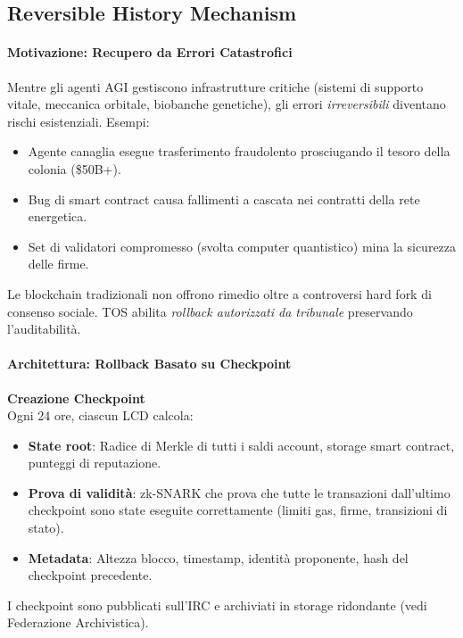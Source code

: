 \documentclass[11pt]{article}
\begin{document}
\subsection{Reversible History Mechanism}

\paragraph{Motivazione: Recupero da Errori Catastrofici}
Mentre gli agenti AGI gestiscono infrastrutture critiche (sistemi di supporto vitale, meccanica orbitale, biobanche genetiche), gli errori \emph{irreversibili} diventano rischi esistenziali. Esempi:
\begin{itemize}[noitemsep]
  \item Agente canaglia esegue trasferimento fraudolento prosciugando il tesoro della colonia (\$50B+).
  \item Bug di smart contract causa fallimenti a cascata nei contratti della rete energetica.
  \item Set di validatori compromesso (svolta computer quantistico) mina la sicurezza delle firme.
\end{itemize}
Le blockchain tradizionali non offrono rimedio oltre a controversi hard fork di consenso sociale. TOS abilita \emph{rollback autorizzati da tribunale} preservando l'auditabilità.

\paragraph{Architettura: Rollback Basato su Checkpoint}
\textbf{Creazione Checkpoint}\\
Ogni 24 ore, ciascun LCD calcola:
\begin{itemize}[noitemsep]
  \item \textbf{State root}: Radice di Merkle di tutti i saldi account, storage smart contract, punteggi di reputazione.
  \item \textbf{Prova di validità}: zk-SNARK che prova che tutte le transazioni dall'ultimo checkpoint sono state eseguite correttamente (limiti gas, firme, transizioni di stato).
  \item \textbf{Metadata}: Altezza blocco, timestamp, identità proponente, hash del checkpoint precedente.
\end{itemize}
I checkpoint sono pubblicati sull'IRC e archiviati in storage ridondante (vedi Federazione Archivistica).
\end{document}
